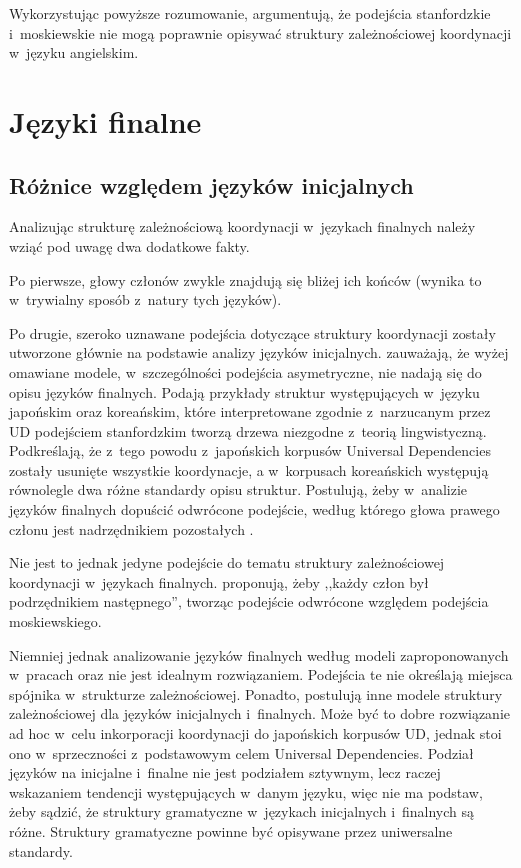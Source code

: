 Wykorzystując powyższe rozumowanie, \cite{przepiorkowski2023conjunct} argumentują, że podejścia stanfordzkie i~moskiewskie nie mogą poprawnie opisywać struktury zależnościowej koordynacji w~języku angielskim.

\section{Języki finalne}

\subsection{Różnice względem języków inicjalnych}

Analizując strukturę zależnościową koordynacji w~językach finalnych należy wziąć pod uwagę dwa dodatkowe fakty.

Po pierwsze, głowy członów zwykle znajdują się bliżej ich końców (wynika to w~trywialny sposób z~natury tych języków).

Po drugie, szeroko uznawane podejścia dotyczące struktury koordynacji zostały utworzone głównie na podstawie analizy języków inicjalnych. %
\cite{kanayama2018coordinate} zauważają, że wyżej omawiane modele, w~szczególności podejścia asymetryczne, nie nadają się do opisu języków finalnych. Podają przykłady struktur występujących w~języku japońskim oraz koreańskim, które interpretowane zgodnie z~narzucanym przez UD podejściem stanfordzkim tworzą drzewa niezgodne z~teorią lingwistyczną. Podkreślają, że z~tego powodu z~japońskich korpusów Universal Dependencies zostały usunięte wszystkie koordynacje, a w~korpusach koreańskich występują równolegle dwa różne standardy opisu struktur. Postulują, żeby w~analizie języków finalnych dopuścić odwrócone podejście, według którego głowa prawego członu jest nadrzędnikiem pozostałych \citep{kanayama2018coordinate}.

Nie jest to jednak jedyne podejście do tematu struktury zależnościowej koordynacji w~językach finalnych. \cite{choi2011statistical} proponują, żeby ,,każdy człon był podrzędnikiem następnego'', tworząc podejście odwrócone względem podejścia moskiewskiego.

Niemniej jednak analizowanie języków finalnych według modeli zaproponowanych w~pracach \cite{kanayama2018coordinate} oraz \cite{choi2011statistical} nie jest idealnym rozwiązaniem. Podejścia te nie określają miejsca spójnika w~strukturze zależnościowej. Ponadto, \cite{kanayama2018coordinate} postulują inne modele struktury zależnościowej dla języków inicjalnych i~finalnych. Może być to dobre rozwiązanie ad hoc w~celu inkorporacji koordynacji do japońskich korpusów UD, jednak stoi ono w~sprzeczności z~podstawowym celem Universal Dependencies. Podział języków na inicjalne i~finalne nie jest podziałem sztywnym, lecz raczej wskazaniem tendencji występujących w~danym języku, więc nie ma podstaw, żeby sądzić, że struktury gramatyczne w~językach inicjalnych i~finalnych są różne. Struktury gramatyczne powinne być opisywane przez uniwersalne standardy.

